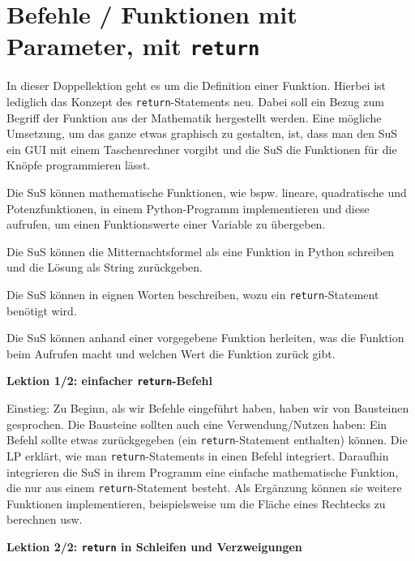 \section{Befehle / Funktionen mit Parameter, mit \texorpdfstring{\lstinline|return|}{return}}
\begin{myExBox}
In dieser Doppellektion geht es um die Definition einer Funktion. Hierbei ist lediglich das Konzept des \lstinline|return|-Statements neu. Dabei soll ein Bezug zum Begriff der Funktion aus der Mathematik hergestellt werden. Eine mögliche Umsetzung, um das ganze etwas graphisch zu gestalten, ist, dass man den SuS ein GUI mit einem Taschenrechner vorgibt und die SuS die Funktionen für die Knöpfe programmieren lässt.

\begin{todolist}
    \item Die SuS können mathematische Funktionen, wie bspw. lineare, quadratische und Potenzfunktionen, in einem Python-Programm implementieren und diese aufrufen, um einen Funktionswerte einer Variable zu übergeben.
    \item Die SuS können die Mitternachtsformel als eine Funktion in Python schreiben und die Lösung als String zurückgeben.
    \item Die SuS können in eignen Worten beschreiben, wozu ein \lstinline|return|-Statement benötigt wird.
    \item Die SuS können anhand einer vorgegebene Funktion herleiten, was die Funktion beim Aufrufen macht und welchen Wert die Funktion zurück gibt.
\end{todolist}

\textbf{Lektion 1/2: einfacher \lstinline|return|-Befehl}

Einstieg: Zu Beginn, als wir Befehle eingeführt haben, haben wir von Bausteinen gesprochen. Die Bausteine sollten auch eine Verwendung/Nutzen haben: Ein Befehl sollte etwas zurückgegeben (ein \lstinline|return|-Statement enthalten) können. Die LP erklärt, wie man \lstinline|return|-Statements in einen Befehl integriert. Daraufhin integrieren die SuS in ihrem Programm eine einfache mathematische Funktion, die nur aus einem \lstinline|return|-Statement besteht. Als Ergänzung können sie weitere Funktionen implementieren, beispielsweise um die Fläche eines Rechtecks zu berechnen usw. 

\textbf{Lektion 2/2: \lstinline|return| in Schleifen und Verzweigungen}


\end{myExBox}
